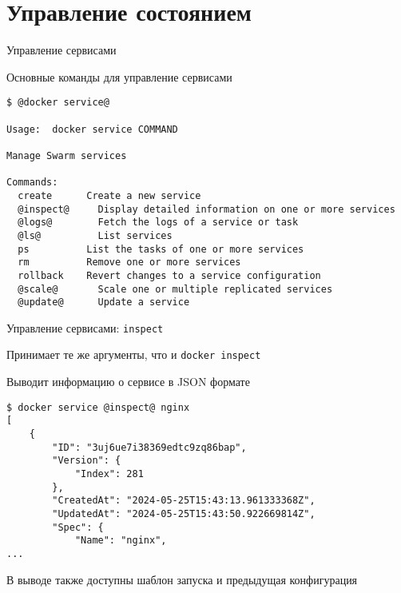 \section{Управление состоянием}\label{sec:management}
\begin{frame}[fragile]{Управление сервисами }

Основные команды для управление сервисами

\begin{tcolorbox-code}
\begin{lstlisting}[style=base]
$ @docker service@

Usage:  docker service COMMAND

Manage Swarm services

Commands:
  create      Create a new service
  @inspect@     Display detailed information on one or more services
  @logs@        Fetch the logs of a service or task
  @ls@          List services
  ps          List the tasks of one or more services
  rm          Remove one or more services
  rollback    Revert changes to a service configuration
  @scale@       Scale one or multiple replicated services
  @update@      Update a service
\end{lstlisting}
\end{tcolorbox-code}

\end{frame}

\begin{frame}[fragile]{Управление сервисами: \texttt{inspect} }

Принимает те же аргументы, что и \texttt{docker inspect}

Выводит информацию о сервисе в JSON формате

\begin{tcolorbox-code}
\begin{lstlisting}[style=base]
$ docker service @inspect@ nginx
[
    {
        "ID": "3uj6ue7i38369edtc9zq86bap",
        "Version": {
            "Index": 281
        },
        "CreatedAt": "2024-05-25T15:43:13.961333368Z",
        "UpdatedAt": "2024-05-25T15:43:50.922669814Z",
        "Spec": {
            "Name": "nginx",
...
\end{lstlisting}
\end{tcolorbox-code}

В выводе также доступны шаблон запуска и предыдущая конфигурация

\end{frame}

